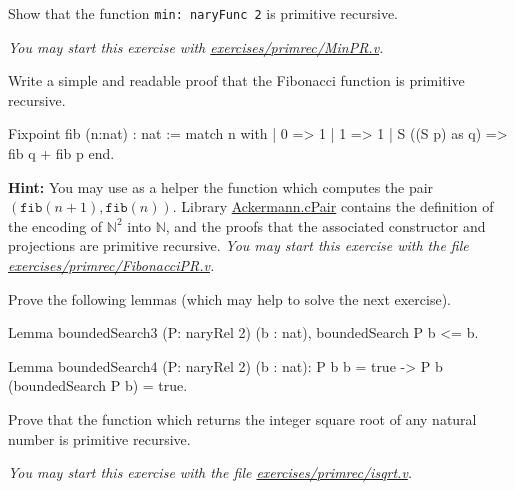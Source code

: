 \begin{exercise}
Show that the function \texttt{min: naryFunc\,2} is primitive
recursive.

\emph{You may start this exercise with
    \href{https://https://github.com/coq-community/hydra-battles/blob/master/exercises/primrec/MinPR.v}{exercises/primrec/MinPR.v}.}

\end{exercise}


\begin{exercise}
Write a simple and readable proof that the Fibonacci function is primitive recursive.


\begin{Coqsrc}
Fixpoint fib (n:nat) : nat :=
  match n with
  | 0 => 1
  | 1 => 1
  | S ((S p) as q) => fib q + fib p
  end.
\end{Coqsrc}

\textbf{Hint:}  You may use as a helper the function which computes the pair \linebreak
$(\texttt{fib}(n+1),\texttt{fib}(n))$. 
Library \href{../theories/html/hydras.Ackermann.cPair.html}{Ackermann.cPair} contains
the definition of the encoding of $\mathbb{N}^2$ into $\mathbb{N}$, and the proofs that 
the associated constructor and projections are primitive recursive.
\emph{You may start this exercise with the file
    \href{https://github.com/coq-community/hydra-battles/blob/master/exercises/primrec/FibonacciPR.v}{exercises/primrec/FibonacciPR.v}.}

\end{exercise}

\begin{exercise}
Prove the following lemmas (which may help to solve the next  exercise).

\begin{Coqsrc}
Lemma boundedSearch3 (P: naryRel 2) (b  : nat), 
    boundedSearch P b <= b. 

Lemma boundedSearch4 (P: naryRel 2) (b  : nat):
  P b b = true -> P b (boundedSearch P b) = true.
\end{Coqsrc}
\end{exercise}


\begin{exercise}
Prove that the function which returns the  integer square root of any natural number  is primitive recursive.

\emph{You may start this exercise with the file
    \href{https://github.com/coq-community/hydra-battles/blob/master/exercises/primrec/isqrt.v}{exercises/primrec/isqrt.v}.}

\end{exercise}

